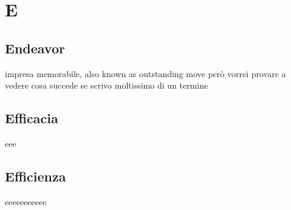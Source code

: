 \section{E}

\subsection{Endeavor} impresa memorabile, also known as outstanding move però vorrei provare a vedere cosa succede se scrivo moltissimo di un termine
\subsection{Efficacia} eee
\subsection{Efficienza} eeeeeeeeeee